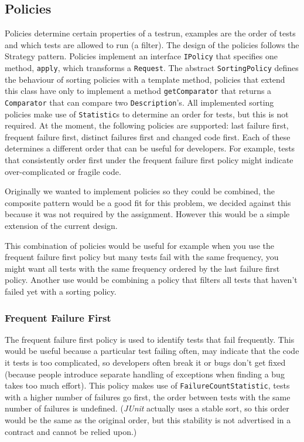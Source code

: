 \documentclass[i2]{oss}
\newcommand{\class}[1]{\texttt{#1}}
\newcommand{\method}[1]{\texttt{#1}}
\newcommand{\junit}{\emph{JUnit }}
\begin{document}

\subsection{Policies}
\label{subssec: Policies}

Policies determine certain properties of a testrun, examples are
the order of tests and which tests are allowed to run (a filter).
The design of the policies follows the Strategy pattern.
Policies implement an interface \class{IPolicy} that specifies one method,
\method{apply}, which transforms a \class{Request}.
The abstract \class{SortingPolicy} defines the behaviour of sorting
policies with a template method, policies that extend this class have
only to implement a method \method{getComparator} that returns a 
\class{Comparator} that can compare two \class{Description}'s.
All implemented sorting policies make use of \class{Statistic}s to 
determine an order for tests, but this is not required.
At the moment, the following policies are supported: last failure first, 
frequent failure first, distinct failures first and changed code  first.
Each of these determines a different order that can be useful for
developers.
For example, tests that consistently order first under the frequent
failure first policy might indicate over-complicated or fragile code.

Originally we wanted to implement policies so they could be combined,
the composite pattern would be a good fit for this problem,
we decided against this because it was not required by the assignment.
However this would be a simple extension of the current design.

This combination of policies would be useful for example when you use
the frequent failure first policy but many tests fail with the
same frequency, you might want all tests with the same frequency ordered
by the last failure first policy.
Another use would be combining a policy that filters all tests that 
haven't failed yet with a sorting policy.

\subsubsection{Frequent Failure First}

The frequent failure first policy is used to identify tests that fail
frequently.
This would be useful because a particular test failing often, may 
indicate that the code it tests is too complicated, so developers often 
break it or bugs don't get fixed (because people introduce separate 
handling of exceptions when finding a bug takes too much effort).
This policy makes use of \class{FailureCountStatistic}, tests with a 
higher number of failures go first, the order between tests with the same 
number of failures is undefined.
(\junit actually uses a stable sort, so this order would be the same as 
the original order, but this stability is not advertised in a contract 
and cannot be relied upon.)
\end{document}
